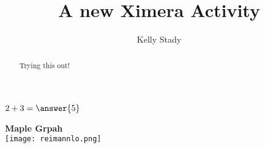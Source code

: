 \documentclass{ximera}
\title{A new Ximera Activity}
\author{Kelly Stady}
\begin{document}
\begin{abstract}
    Trying this out!
\end{abstract}
\maketitle


\begin{exercise}
    $2+3=\answer{5}$
\end{exercise}



\begin{center} %
\textbf{Maple Grpah} \\

    \texttt{[image: reimannlo.png]}
\end{center}
\end{document}
